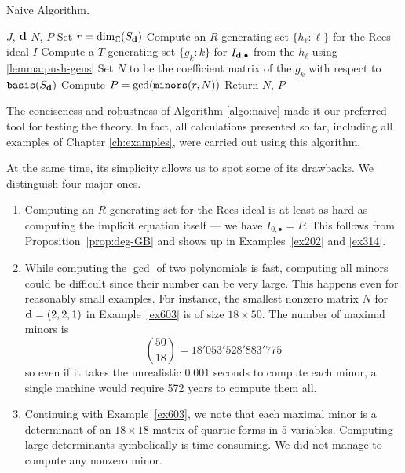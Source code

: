 \documentclass[fleqn,reqno]{amsart}
\begin{document}
\begin{algorithm} {\sc Naive Algorithm\bf.}
\label{algo:naive}
\begin{algorithmic}
   $J$, $\mathbf d$
   $N$, $P$
  \State Set $r=\dim_{\mathbb{C}}(S_{\mathbf d})$
  \State Compute an $R$-generating set $\{h_\ell:\ell\}$ for the Rees ideal $I$
  \State Compute a $T$-generating set $\{g_k:k\}$ for $I_{\mathbf d,\bullet}$ from the $h_\ell$
  	using \eqref{lemma:push-gens}
  \State Set $N$ to be the coefficient matrix of the $g_k$ with respect to $\mathop{\tt basis}(S_\mathbf d)$
  \State Compute $P=\gcd(\mathop{\tt minors}(r,N))$
  \State Return $N$, $P$
\end{algorithmic}
\end{algorithm}

\begin{paragraf}
\label{par:flaws}
The conciseness and robustness of Algorithm \ref{algo:naive} made it our preferred tool
for testing the theory.
In fact, all calculations presented so far,
including all examples of Chapter \ref{ch:examples},
were carried out using this algorithm.

At the same time, its simplicity allows us to spot some of its drawbacks.
We distinguish four major ones.
\begin{enumerate}
\item
\label{itm:flaws:GB}
Computing an $R$-generating set for the Rees ideal is at least as hard as
computing the implicit equation itself --- we have $I_{0,\bullet}=P$.
This follows from Proposition~\ref{prop:deg-GB} and
shows up in Examples~\ref{ex202} and \ref{ex314}.

\item
\label{itm:flaws:many-minors}
While computing the $\gcd$ of two polynomials is fast,
computing all minors could be difficult since their number can be very large.
This happens even for reasonably small examples.
For instance, the smallest nonzero matrix $N$ for $\mathbf d=(2,2,1)$ in Example~\ref{ex603}
is of size $18\times50$.
The number of maximal minors is
\[
	\binom{50}{18}=18'053'528'883'775
\]
so even if it takes the unrealistic $0.001$ seconds to compute each minor,
a single machine would require 572 years to compute them all.

\item
\label{itm:flaws:large-det}
Continuing with Example~\ref{ex603},
we note that each maximal minor is a determinant of an $18\times18$-matrix
of quartic forms in 5 variables.
Computing large determinants symbolically is time-consuming.
We did not manage to compute any nonzero minor.


\end{enumerate}
\end{paragraf}
\end{document}
